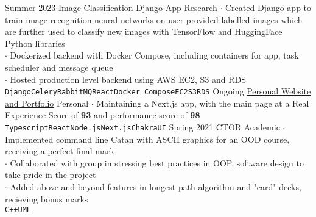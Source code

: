 \documentclass[8pt]{developercv} %
\begin{document}

\begin{minipage}[t]{\textwidth}
	\vspace{-\baselineskip} %

	\begin{entrylist}
		\entry
			{Summer 2023}
			{Image Classification Django App}
			{Research}
			{
				$\cdot$ Created Django app to train image recognition neural networks on user-provided labelled images which are further used to classify new images with TensorFlow and HuggingFace Python libraries\\
				$\cdot$ Dockerized backend with Docker Compose, including containers for app, task scheduler and message queue\\
				$\cdot$ Hosted production level backend using AWS EC2, S3 and RDS\\
				\texttt{Django}\slashsep\texttt{Celery}\slashsep\texttt{RabbitMQ}\slashsep\texttt{React}\slashsep\texttt{Docker Compose}\slashsep\texttt{EC2}\slashsep\texttt{S3}\slashsep\texttt{RDS}
			}
		\entry
			{Ongoing}
			{\href{https://henryhu.dev}{Personal Website and Portfolio}}
			{Personal}
			{
				$\cdot$ Maintaining a Next.js app, with the main page at a Real Experience Score of \textbf{93} and performance score of \textbf{98}\\
				\texttt{Typescript}\slashsep\texttt{React}\slashsep\texttt{Node.js}\slashsep\texttt{Next.js}\slashsep\texttt{ChakraUI}
			}
		\entry
			{Spring 2021}
			{CTOR}
			{Academic}
			{
				$\cdot$ Implemented command line Catan with ASCII graphics for an OOD course, receiving a perfect final mark\\
				$\cdot$ Collaborated with group in stressing best practices in OOP, software design to take pride in the project\\
				$\cdot$ Added above-and-beyond features in longest path algorithm and "card" decks, recieving bonus marks \\
				\texttt{C++}\slashsep\texttt{UML}
			}
	\end{entrylist}
\end{minipage}
\end{document}
